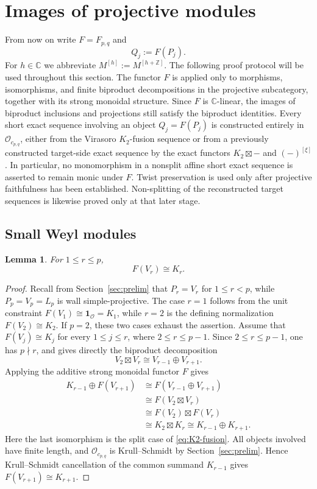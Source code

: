 \documentclass[12pt,leqno]{amsart}
\numberwithin{equation}{section}
\newtheorem{lem}[thm]{Lemma}
\newcommand{\boxt}{\boxtimes}
\newcommand{\Oc}{\mathcal O}
\def\Z{\mathbb{Z}}
\def\C{\mathbb{C}}
\begin{document}
\section{Images of projective modules}\label{sec:images}

From now on write $F=F_{p,q}$ and
\[
 Q_j:=F(P_j).
\]
For $h\in\C$ we abbreviate $M^{[h]}:=M^{[h+\Z]}$.  The following
proof protocol will be used throughout this section.  The functor $F$ is
applied only to morphisms, isomorphisms, and finite biproduct
decompositions in the projective subcategory, together with its strong
monoidal structure.  Since $F$ is $\C$-linear, the images of biproduct
inclusions and projections still satisfy the biproduct identities.
Every short exact sequence involving an object $Q_j=F(P_j)$ is
constructed entirely in $\Oc_{c_{p,q}}$, either from the Virasoro
$K_2$-fusion sequence or from a previously constructed target-side exact
sequence by the exact functors $K_2\boxtimes-$ and $(-)^{[\xi]}$.
In particular, no monomorphism in a nonsplit affine short exact sequence
is asserted to remain monic under $F$.  Twist preservation is used only
after projective faithfulness has been established.  Non-splitting of the
reconstructed target sequences is likewise proved only at that later
stage.

\subsection{Small Weyl modules}

\begin{lem}\label{lem:F-small-Weyl}
For $1\leq r\leq p$,
\[
 F(V_r)\cong K_r.
\]
\end{lem}

\begin{proof}
Recall from Section~\ref{sec:prelim} that $P_r=V_r$ for $1\le r<p$,
while $P_p=V_p=L_p$ is wall simple-projective.  The case $r=1$ follows from the unit constraint
$F(V_1)\cong\mathbf1_{\Oc}=K_1$, while $r=2$ is the defining normalization
$F(V_2)\cong K_2$.  If $p=2$, these two cases exhaust the assertion.
Assume that $F(V_j)\cong K_j$ for every $1\le j\le r$, where
$2\le r\le p-1$.  Since $2\le r\le p-1$, one has $p\nmid r$, and
\cite[Theorem~2.23]{McRaeYang} gives directly the biproduct
decomposition
\[
 V_2\boxt V_r\cong V_{r-1}\oplus V_{r+1}.
\]
Applying the additive strong monoidal functor $F$ gives
\[
\begin{aligned}
 K_{r-1}\oplus F(V_{r+1})
 &\cong F(V_{r-1}\oplus V_{r+1})\\
 &\cong F(V_2\boxt V_r)\\
 &\cong F(V_2)\boxt F(V_r)\\
 &\cong K_2\boxt K_r
 \cong K_{r-1}\oplus K_{r+1}.
\end{aligned}
\]
Here the last isomorphism is the split case of
\eqref{eq:K2-fusion}.  All objects involved have finite length, and
$\Oc_{c_{p,q}}$ is Krull--Schmidt by Section~\ref{sec:prelim}.  Hence
Krull--Schmidt cancellation of the common summand $K_{r-1}$ gives
$F(V_{r+1})\cong K_{r+1}$.
\end{proof}
\end{document}
